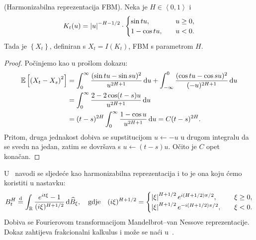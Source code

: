 \documentclass[main.tex]{subfiles}
\begin{document}
\begin{teorem} (Harmonizabilna reprezentacija FBM).
	Neka je \( H \in \left\langle0,1\right\rangle \) i
	\begin{equation}
		K_t(u) =
		\left| {u} \right|^{-H-1/2} \cdot \begin{cases}
			\sin tu, \quad   & u \ge 0, \\
			1-\cos tu, \quad & u < 0.
		\end{cases}
	\end{equation}
	Tada je \( \left\{ X_t \right\} \),
	definiran s \( X_t = I(K_t) \), FBM s parametrom \( H \).
\end{teorem}

\begin{proof}
	Počinjemo kao u prošlom dokazu:
	\begin{align}
		\mathbb{E} \left[ \left( X_t-X_s \right)^2 \right] & =
		\int_0^\infty \frac{(\sin tu - \sin su)^2}{u^{2H+1}} \,\mathrm d u +
		\int_{-\infty}^0 \frac{(\cos tu - \cos su)^2}{(-u)^{2H+1}} \,\mathrm d u                                  \\
		                                           & = \int_0^\infty \frac{2-2\cos(t-s)u}{u^{2H+1}} \,\mathrm d u \\ &=  (t-s)^{2H}\int_0^\infty \frac{1-\cos u}{u^{2H+1}} \,\mathrm d u =C(t-s)^{2H}.
	\end{align}
	Pritom, druga jednakost dobiva se supstitucijom \( u \leftarrow -u \)
	u drugom integralu da se svedu na jedan, zatim se
	dovršava s \( u \leftarrow (t-s)u \). Očito je \( C \) opet konačan.
\end{proof}

\begin{komentar}\label{kom:harmrep}
	U~\cite{ayache} navodi se sljedeće kao harmonizabilna reprezentacija i to
	je ona koju ćemo koristiti u nastavku:
	\begin{equation}\label{eq:harmrep}
		B^H_t \stackrel{\mathrm d}{=}
		\int_{\mathbb{R}} \frac{e^{it\xi}-1}{(i\xi)^{H+1/2}} \,\mathrm d \widehat{B}_\xi,
		\quad \text{gdje} \quad
		(i\xi)^{H+1/2}=\begin{cases}
			\left| {\xi} \right| ^{H+1/2} e^{i(H+1/2)\pi/2}, \quad  & \xi \ge 0, \\
			\left| {\xi} \right| ^{H+1/2} e^{-i(H+1/2)\pi/2}, \quad & \xi < 0.
		\end{cases}
	\end{equation}
	Dobiva se Fourierovom transformacijom Mandelbrot--van Nessove reprezentacije. Dokaz
	zahtijeva frakcionalni kalkulus i može se naći u~\cite{ojeda}.
\end{komentar}
\end{document}
